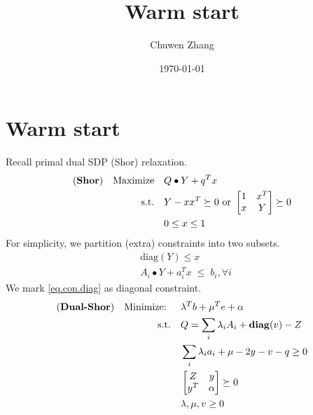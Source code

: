 \documentclass[../main]{subfiles}
\title{Warm start}
\author{Chuwen Zhang}
\date{\today}
\begin{document}
\maketitle
{
    \setcounter{tocdepth}{3}
    \tableofcontents
}
\section{Warm start}
Recall primal dual SDP (Shor) relaxation.
\begin{equation}
    \begin{aligned}
        (\textbf{Shor}) \quad\mathrm{Maximize}\quad & Q\bullet Y   + q^T x                                             \\
        \mathrm{s.t.}  \quad                     & Y-xx^T \succeq 0 \text { or }\begin{bmatrix} 1 & x^{T} \\ x & Y \end{bmatrix} \succeq 0 \\
                                                 & 0\le x\le 1                                                      \\
    \end{aligned}
\end{equation}
For simplicity, we partition (extra) constraints into two subsets.
\begin{align}
    \label{eq.con.diag}    & \mathrm{diag}(Y) \le x                           \\
    \label{eq.con.regular} & A_i \bullet Y + a_i^Tx \; \le  \; b_i, \forall i
\end{align}
We mark \eqref{eq.con.diag} as diagonal constraint.
\begin{equation}
    \begin{aligned}
        (\textbf{Dual-Shor}) \quad \textrm{Minimize: }\quad & \lambda^Tb + \mu^Te + \alpha                   \\
        \mathrm{s.t.} \quad                              & Q = \sum_i \lambda_i A_i  + \mathbf{diag}(v)  -Z       \\
                                                         & \sum_i \lambda_i a_i + \mu - 2 y - v - q \ge 0 \\
                                                         & \begin{bmatrix}Z & y \\ y^T & \alpha\end{bmatrix} \succeq 0            \\
                                                         & \lambda, \mu, v \ge 0
    \end{aligned}
\end{equation}
\end{document}
